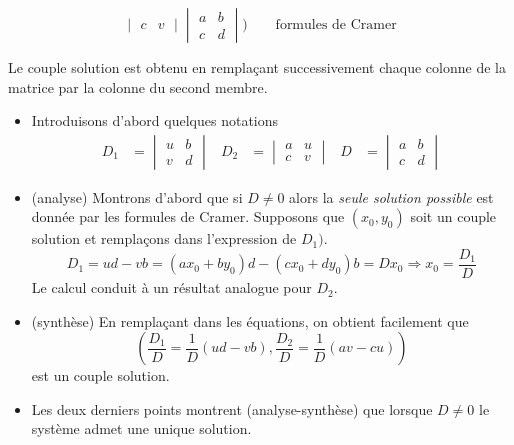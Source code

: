 \begin{description}
\begin{prop}
\begin{displaymath}
{\begin{vmatrix}
  c & v
\end{vmatrix}
}
{
\begin{vmatrix}
  a & b \\
  c & d
\end{vmatrix}
}) \qquad \text{formules de Cramer}
\end{displaymath}
\end{prop}
\begin{rem}
 Le couple solution est obtenu en remplaçant successivement chaque colonne de la matrice par la colonne du second membre.
\end{rem}
\begin{demo}
 \begin{itemize}
  \item Introduisons d'abord quelques notations 
\begin{align*}
 D_1 &=\begin{vmatrix}
  u & b \\
  v & d
\end{vmatrix}
 &
 D_2 &=\begin{vmatrix}
  a & u \\
  c & v
\end{vmatrix}
 &
 D &=\begin{vmatrix}
  a & b \\
  c & d
\end{vmatrix}
\end{align*}

\item (analyse) Montrons d'abord que si $D\neq 0$ alors la \emph{seule solution possible} est donnée par les formules de Cramer. Supposons que $(x_0,y_0)$ soit un couple solution et remplaçons dans l'expression de $D_1)$.
\begin{displaymath}
 D_1 = ud-vb = (ax_0 + by_0)d-(cx_0+dy_0)b = D x_0 \Rightarrow x_0 = \dfrac{D_1}{D}
\end{displaymath}
Le calcul conduit à un résultat analogue pour $D_2$.

\item (synthèse) En remplaçant dans les équations, on obtient facilement que
\begin{displaymath}
 (\dfrac{D_1}{D}=\dfrac{1}{D}(ud-vb), \dfrac{D_2}{D}=\dfrac{1}{D}(av-cu))
\end{displaymath}
 est un couple solution.

\item Les deux derniers points montrent (analyse-synthèse) que lorsque $D\neq0$ le système admet une unique solution.


\end{itemize}
\end{demo}
\end{description}
